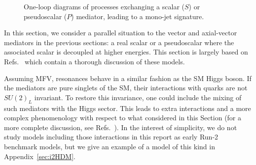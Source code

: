 \begin{figure}
\centering
{}\linewidth
\vspace{0.5\baselineskip}
	\caption
	{
		One-loop diagrams of processes exchanging a scalar ($S$) or pseudoscalar ($P$) mediator, leading to a mono-jet signature. 
	}
	\label{fig:feyn_prod_S}
\end{figure}

In this section, we consider a parallel situation to the vector and axial-vector mediators in the previous sections: a real scalar or a pseudoscalar where the associated scalar is decoupled at higher energies. This section is largely based on Refs.~\cite{Buckley:2014fba,Harris:2014hga,Haisch:2015ioa} which contain a thorough discussion of these models. 

Assuming MFV, \spinzero resonances behave in a similar fashion as the SM Higgs boson. If the mediators are pure singlets of the SM, their interactions with quarks are not $SU(2)_L$ invariant. To restore this invariance, one could include the mixing of such mediators with the Higgs sector. This leads to extra interactions and a more complex phenomenology with respect to what considered in this Section (for a more complete discussion, see Refs.~\cite{Buckley:2014fba,Haisch:2015ioa}). In the interest of simplicity, we do not study models including those interactions in this report as early Run-2 benchmark models, but we give an example of a model of this kind in Appendix~\ref{sec:i2HDM}. 

